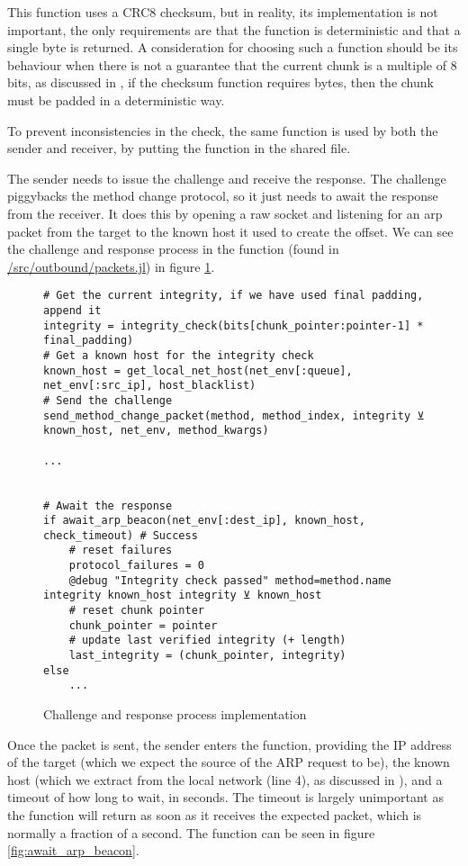 This function uses a CRC8 checksum, but in reality, its implementation is not important, the only requirements are that the function is deterministic and that a single byte is returned. A consideration for choosing such a function should be its behaviour when there is not a guarantee that the current chunk is a multiple of 8 bits, as discussed in , if the checksum function requires bytes, then the chunk must be padded in a deterministic way.

To prevent inconsistencies in the check, the same function is used by both the sender and receiver, by putting the function in the shared  file.

The sender needs to issue the challenge and receive the response. The challenge piggybacks the method change protocol, so it just needs to await the response from the receiver. It does this by opening a raw socket and listening for an arp packet from the target to the known host it used to create the offset. We can see the challenge and response process in the  function (found in \url{/src/outbound/packets.jl}) in figure \ref{fig:chal_resp}.

\begin{figure}[h]
\begin{lstlisting}[language=JuliaLocal, style=julia]
# Get the current integrity, if we have used final padding, append it
integrity = integrity_check(bits[chunk_pointer:pointer-1] * final_padding)
# Get a known host for the integrity check
known_host = get_local_net_host(net_env[:queue], net_env[:src_ip], host_blacklist)
# Send the challenge
send_method_change_packet(method, method_index, integrity ⊻ known_host, net_env, method_kwargs)

...


# Await the response
if await_arp_beacon(net_env[:dest_ip], known_host, check_timeout) # Success
    # reset failures
    protocol_failures = 0
    @debug "Integrity check passed" method=method.name integrity known_host integrity ⊻ known_host
    # reset chunk pointer
    chunk_pointer = pointer
    # update last verified integrity (+ length)
    last_integrity = (chunk_pointer, integrity)
else
    ...
\end{lstlisting}
\caption{Challenge and response process implementation}
\label{fig:chal_resp}
\end{figure}

Once the packet is sent, the sender enters the  function, providing the IP address of the target (which we expect the source of the ARP request to be), the known host (which we extract from the local network (line 4), as discussed in ), and a timeout of how long to wait, in seconds. The timeout is largely unimportant as the function will return as soon as it receives the expected packet, which is normally a fraction of a second. The function can be seen in figure \ref{fig:await_arp_beacon}.

